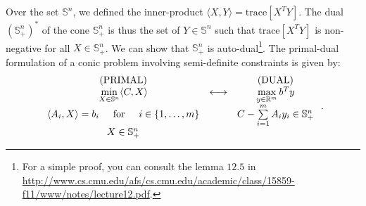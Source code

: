 Over the set $\mathbb{S}^n$, we defined the inner-product $\langle X,Y \rangle = \mathrm{trace}[X^TY]$. The dual $(\mathbb{S}^n_+)^*$ of the cone $\mathbb{S}^n_+$ is thus the set of $Y\in\mathbb{S}^n$ such that $\mathrm{trace}[X^TY]$ is non-negative for all $X\in\mathbb{S}^n_+$. We can show that $\mathbb{S}^n_+$ is auto-dual\footnote{For a simple proof, you can consult the lemma $12.5$ in \url{http://www.cs.cmu.edu/afs/cs.cmu.edu/academic/class/15859-f11/www/notes/lecture12.pdf}.}. The primal-dual formulation of a conic problem involving semi-definite constraints is given by:
\begin{equation*}
\begin{array}{ccc}
    \text{(PRIMAL)} & & \text{(DUAL)} \\
    \min\limits_{X\in\mathbb{S}^n} \langle C,X \rangle & \longleftrightarrow & \max\limits_{y\in\mathbb{R}^m}  b^Ty \\
    \langle A_i,X \rangle = b_i \hspace{5mm} \text{for} \hspace{5mm} i\in\lbrace 1,\dots,m\rbrace & & C -\sum\limits_{i=1}^m A_iy_i \in \mathbb{S}^n_+ \\
    X \in \mathbb{S}^n_+ & &
\end{array} \:.
\end{equation*}
%
%
